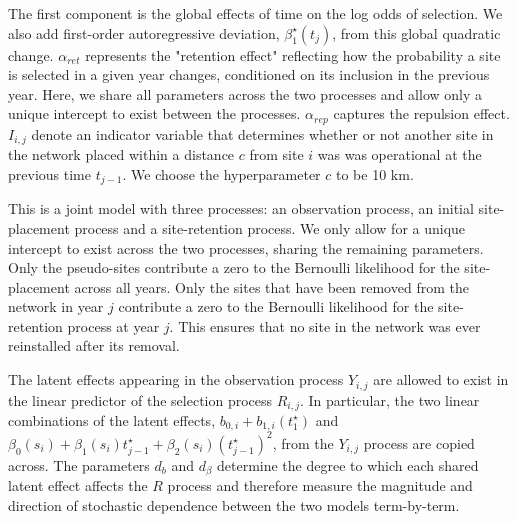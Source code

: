 The first component is the global effects of time on the log odds of selection. We also add 
first-order autoregressive deviation, $\beta_1^{\star}(t_j)$, from this global quadratic change.
$\alpha_{ret}$ represents the "retention effect" reflecting how the probability a site is selected in a 
given year changes, conditioned on its inclusion in the previous year. Here, we share all parameters
across the two processes and allow only a unique intercept to exist between the processes.
$\alpha_{rep}$ captures the repulsion effect. $I_{i, j}$ denote an indicator variable that determines
whether or not another site in the network placed within a distance $c$ from site $i$ was
was operational at the previous time $t_{j-1}$. We choose the hyperparameter $c$ to be 10 km.

This is a joint model with three processes: an observation process, an initial site-placement process
and a site-retention process. We only allow for a unique intercept to exist across the two processes, 
sharing the remaining parameters. Only the pseudo-sites contribute a zero to the 
Bernoulli likelihood for the site-placement across all years. Only the sites that have been removed 
from the network in year $j$ contribute a zero to the Bernoulli likelihood for the site-retention
process at year $j$. This ensures that no site in the network was ever reinstalled after its removal. 

The latent effects appearing in the observation process $Y_{i, j}$ are allowed to exist
in the linear predictor of the selection process $R_{i, j}$. In particular, the two linear combinations 
of the latent effects, $b_{0, i} + b_{1, i}(t_1^{\star})$ and 
$\beta_0(s_i) + \beta_1(s_i)t_{j-1}^{\star} + \beta_2(s_i)(t_{j-1}^{\star})^2$, from the $Y_{i, j}$ 
process are copied across. The parameters $d_b$ and $d_{\beta}$ determine the degree to which each shared
latent effect affects the $R$ process and therefore measure the magnitude and direction of stochastic
dependence between the two models term-by-term. 
